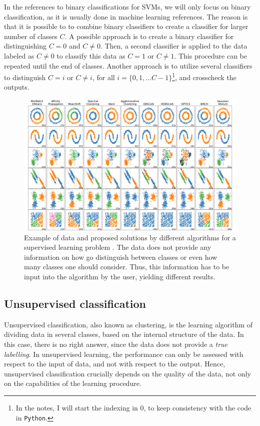 \documentclass[]{report}
\begin{document}
In the references to binary classifications for SVMs, we will only focus on binary classification, as it is usually done in machine learning references. The reason is that it is possible to to combine binary classifiers to create a classifier for larger number of classes $C$. A possible approach is to create a binary classifier for distinguishing $C = 0$ and $C \neq 0$. Then, a second classifier is applied to the data labeled as $C \neq 0$ to classify this data as $C = 1$ or $C \neq 1$. This procedure can be repeated until the end of classes. Another approach is to utilize several classifiers to distinguish $C = i$ or $C \neq i$, for all $i = \{0, 1,\ldots C - 1\}$\footnote{In the notes, I will start the indexing in $0$, to keep consistency with the code in \texttt{Python}.}, and crosscheck the outputs. 

\begin{figure}
\centering
\includegraphics[width = .8\linewidth]{images/cluster_datasets}
\caption{Example of data and proposed solutions by different algorithms for a supervised learning problem \cite{pedregosa2011scikitlearn}. The data does not provide any information on how go distinguish between classes or even how many classes one should consider. Thus, this information has to be input into the algorithm by the user, yielding different results. }
\label{fig.unsupervised-learning}
\end{figure}

\subsection{Unsupervised classification}\label{sec.unsupervised-classification}

Unsupervised classification, also known as clustering, is the learning algorithm of dividing data in several classes, based on the internal structure of the data. In this case, there is no right answer, since the data does not provide a \textit{true labelling}. In unsupervised learning, the performance can only be assessed with respect to the input of data, and not with respect to the output. Hence, unsupervised classification crucially depends on the quality of the data, not only on the capabilities of the learning procedure. 
\end{document}

